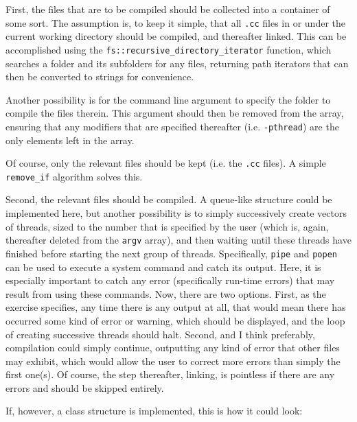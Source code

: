 First, the files that are to be compiled should be collected into a container of some sort. The assumption is, to keep it simple, that all \texttt{.cc} files in or under the current working directory should be compiled, and thereafter linked. This can be accomplished using the \texttt{fs::recursive\_directory\_iterator} function, which searches a folder and its subfolders for any files, returning path iterators that can then be converted to strings for convenience.

Another possibility is for the command line argument to specify the folder to compile the files therein. This argument should then be removed from the array, ensuring that any modifiers that are specified thereafter (i.e. \texttt{-pthread}) are the only elements left in the array.

Of course, only the relevant files should be kept (i.e. the \texttt{.cc} files). A simple \texttt{remove\_if} algorithm solves this.

Second, the relevant files should be compiled. A queue-like structure could be implemented here, but another possibility is to simply successively create vectors of threads, sized to the number that is specified by the user (which is, again, thereafter deleted from the \texttt{argv} array), and then waiting until these threads have finished before starting the next group of threads. Specifically, \texttt{pipe} and \texttt{popen} can be used to execute a system command and catch its output. Here, it is especially important to catch any error (specifically run-time errors) that may result from using these commands. Now, there are two options. First, as the exercise specifies, any time there is any output at all, that would mean there has occurred some kind of error or warning, which should be displayed, and the loop of creating successive threads should halt. Second, and I think preferably, compilation could simply continue, outputting any kind of error that other files may exhibit, which would allow the user to correct more errors than simply the first one(s). Of course, the step thereafter, linking, is pointless if there are any errors and should be skipped entirely.

If, however, a class structure is implemented, this is how it could look:

